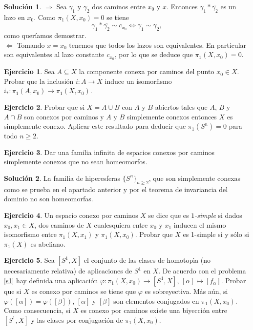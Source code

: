 \documentclass{article}
\theoremstyle{plain}
\theoremstyle{definition}
\newtheorem{exercise}{Ejercicio}
\newtheorem*{sol*}{Solución}
\begin{document}
\begin{sol*}
$\boxed{\Rightarrow}$ Sea $\gamma_1$ y $\gamma_2$ dos caminos entre $x_0$ y $x$. Entonces $\gamma_1*\overline{\gamma_2}$ es un lazo en $x_0$. Como $\pi_1(X,x_0)=0$ se tiene
\[
\gamma_1*\overline{\gamma_2}\sim c_{x_0}\Leftrightarrow \gamma_1\sim\gamma_2,
\]
como queríamos demostrar.\\
$\boxed{\Leftarrow}$ Tomando $x=x_0$ tenemos que todos los lazos son equivalentes. En particular son equivalentes al lazo constante $c_{x_0}$, por lo que se deduce que $\pi_1(X,x_0)=0$.
\end{sol*}


\newpage \begin{exercise} Sea $A\subseteq X$ la componente conexa por caminos del punto $x_0\in X$. Probar que la inclusi\'on
$i: A\to X$ induce un isomorfismo $i_*: \pi_1(A,x_0) \to \pi_1(X,x_0)$.
\end{exercise}

\newpage 

\begin{exercise}
Probar que si $X = A\cup B$ con $A$ y $B$ abiertos tales que $A$, $B$ y $A\cap B$ son conexos por caminos
 y $A$ y $B$ simplemente conexos entonces  $X$ es simplemente conexo. Aplicar este resultado para deducir
 que $\pi_1(S^n) = 0$ para todo $n \geq 2$.
\end{exercise}
\newpage 
\begin{exercise}
Dar una familia infinita de espacios conexos por caminos simplemente conexos que no sean homeomorfos.
\end{exercise}
\begin{sol*}
La familia de hiperesferas $\{S^n\}_{n\geq 2}$, que son simplemente conexas como se prueba en el apartado anterior y por el teorema de invariancia del dominio no son homeomorfas. 
\end{sol*}

\vspace{0.1cm}

\newpage \begin{exercise} Un espacio conexo por caminos $X$ se dice que es {\it $1$-simple} si
dados $x_0, x_1\in X$, dos caminos de $X$ cualesquiera entre $x_0$ y $x_1$ inducen el mismo
isomorfismo entre $\pi_1(X,x_1)$ y $\pi_1(X,x_0)$.
Probar que $X$ es 1-simple si y s\'olo si $\pi_1(X)$ es abeliano.
\end{exercise}

\newpage 
\begin{exercise}
Sea $[S^1,X]$ el conjunto de las clases de homotop\'{\i}a (no necesariamente relativa) de aplicaciones de $S^1$ en $X$. De acuerdo con el problema \ref{s1} hay definida una aplicaci\'on $\varphi: \pi_1(X,x_0) \to [S^1,X]$, $[\alpha] \mapsto [f_{\alpha}]$. Probar que si $X$ es conexo por caminos se tiene que $\varphi$ es sobreyectiva. M\'as a\'un, si $\varphi ([\alpha]) = \varphi([\beta])$, $[\alpha]$ y $[\beta]$ son elementos conjugados en $\pi_1(X,x_0)$.
Como consecuencia, si $X$ es conexo por caminos existe una biyecci\'on entre $[S^1,X]$ y las clases por conjugaci\'on de $\pi_1(X,x_0)$.
\end{exercise}
\end{document}
